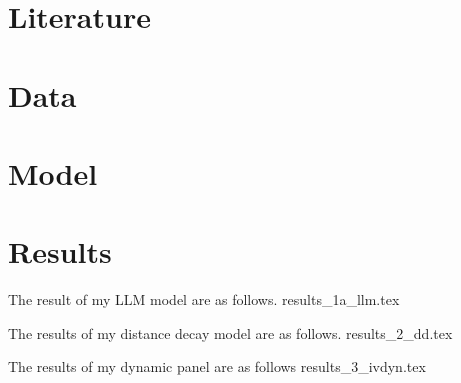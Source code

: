 \documentclass[12pt,a4paper]{article}
\begin{document}


% 
\newpage

\newpage

\newpage

\newpage

\newpage


\newpage
\section{Literature}


\section{Data}


\newpage
\section{Model}


\section{Results}
The result of my LLM model are as follows.
{results_1a_llm.tex}

The results of my distance decay model are as follows.
{results_2_dd.tex}

The results of my dynamic panel are as follows
{results_3_ivdyn.tex}

\
\newpage

\newpage

\end{document}
